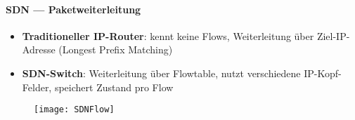 \paragraph{SDN --- Paketweiterleitung}
\begin{itemize}
  \item \textbf{Traditioneller IP-Router}: kennt keine Flows, Weiterleitung über Ziel-IP-Adresse (Longest Prefix Matching)
  \item \textbf{SDN-Switch}: Weiterleitung über Flowtable, nutzt verschiedene IP-Kopf-Felder, speichert Zustand pro Flow
\end{itemize}
\begin{figure}[H]\centering\label{SDNFlow}\texttt{[image: SDNFlow]}\end{figure}